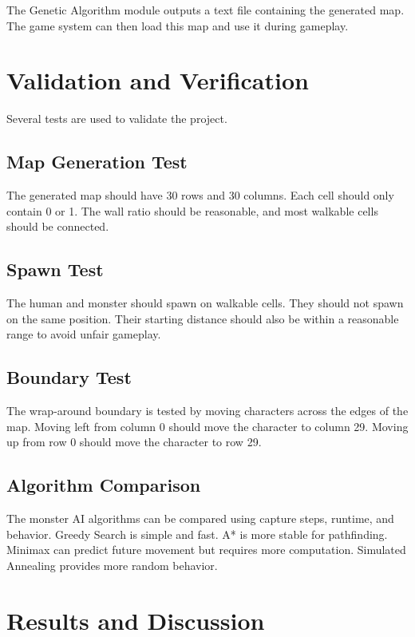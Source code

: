 \documentclass[12pt,a4paper]{article}
\begin{document}
The Genetic Algorithm module outputs a text file containing the generated map. The game system can then load this map and use it during gameplay.

\section{Validation and Verification}

Several tests are used to validate the project.

\subsection{Map Generation Test}

The generated map should have 30 rows and 30 columns. Each cell should only contain 0 or 1. The wall ratio should be reasonable, and most walkable cells should be connected.

\subsection{Spawn Test}

The human and monster should spawn on walkable cells. They should not spawn on the same position. Their starting distance should also be within a reasonable range to avoid unfair gameplay.

\subsection{Boundary Test}

The wrap-around boundary is tested by moving characters across the edges of the map. Moving left from column 0 should move the character to column 29. Moving up from row 0 should move the character to row 29.

\subsection{Algorithm Comparison}

The monster AI algorithms can be compared using capture steps, runtime, and behavior. Greedy Search is simple and fast. A* is more stable for pathfinding. Minimax can predict future movement but requires more computation. Simulated Annealing provides more random behavior.

\section{Results and Discussion}
\end{document}
